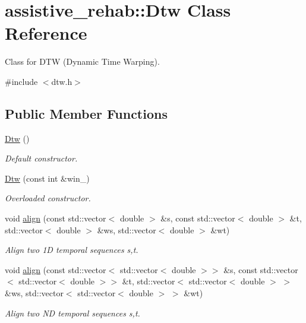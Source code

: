 \section{assistive\+\_\+rehab\+::Dtw Class Reference}
\label{classassistive__rehab_1_1Dtw}


Class for D\+TW (Dynamic Time Warping).  




{\ttfamily \#include $<$dtw.\+h$>$}

\subsection*{Public Member Functions}
\begin{DoxyCompactItemize}
\item 
\mbox{\label{classassistive__rehab_1_1Dtw_a0d7ee684ba230b3c8289f7edd58b18da}} 
\mbox{\hyperlink{classassistive__rehab_1_1Dtw_a0d7ee684ba230b3c8289f7edd58b18da}{Dtw}} ()
\begin{DoxyCompactList}\small\item\em Default constructor. \end{DoxyCompactList}\item 
\mbox{\hyperlink{classassistive__rehab_1_1Dtw_adb11d58b5482f14ade22f5f630a24843}{Dtw}} (const int \&win\+\_\+)
\begin{DoxyCompactList}\small\item\em Overloaded constructor. \end{DoxyCompactList}\item 
void \mbox{\hyperlink{classassistive__rehab_1_1Dtw_a0e3012c72cf4c10a53b914ea7f670e10}{align}} (const std\+::vector$<$ double $>$ \&s, const std\+::vector$<$ double $>$ \&t, std\+::vector$<$ double $>$ \&ws, std\+::vector$<$ double $>$ \&wt)
\begin{DoxyCompactList}\small\item\em Align two 1D temporal sequences s,t. \end{DoxyCompactList}\item 
void \mbox{\hyperlink{classassistive__rehab_1_1Dtw_ac63edfdf11768f9e74df20a952c538d3}{align}} (const std\+::vector$<$ std\+::vector$<$ double $>$$>$ \&s, const std\+::vector$<$ std\+::vector$<$ double $>$$>$ \&t, std\+::vector$<$ std\+::vector$<$ double $>$ $>$ \&ws, std\+::vector$<$ std\+::vector$<$ double $>$ $>$ \&wt)
\begin{DoxyCompactList}\small\item\em Align two ND temporal sequences s,t. \end{DoxyCompactList}\item 

\end{DoxyCompactItemize}
